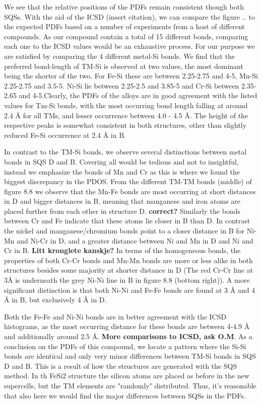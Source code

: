 We see that the relative positions of the PDFs remain consistent though both SQSs. With the aid of the ICSD (insert citation), we can compare the figure .. to the expected PDFs based on a number of experiments from a host of different compounds. As our compound contain a total of 15 different bonds, comparing each one to the ICSD values would be an exhaustive process. For our purpose we are satisfied by comparing the 4 different metal-Si bonds. We find that the preferred bond-length of TM-Si is observed at two values, the most dominant being the shorter of the two. For Fe-Si these are between 2.25-2.75 and 4-5, Mn-Si 2.25-2.75 and 3.5-5. Ni-Si lie between 2.25-2.5 and 3.85-5 and Cr-Si between 2.35-2.65 and 4-5.Clearly, the PDFs of the alloys are in good agreement with the listed values for Tm-Si bonds, with the most occurring bond length falling at around 2.4 Å for all TMs, and lesser occurrence between 4.0 - 4.5 Å. The height of the respective peaks is somewhat consistent in both structures, other than slightly reduced Fe-Si occurrence at 2.4 Å in B.

In contrast to the TM-Si bonds, we observe several distinctions between metal bonds in SQS D and B. Covering all would be tedious and not to insightful, instead we emphasize the bonds of Mn and Cr as this is where we found the biggest discrepancy in the PDOS. From the different TM-TM bonds (middle) of figure 8.8 we observe that the Mn-Fe bonds are most occurring at short distances in D and bigger distances in B, meaning that manganese and iron atoms are placed further from each other in structure D. \textbf{correct?} Similarly the bonds between Cr and Fe   indicate that these atoms lie closer in B than D. In contrast the nickel and manganese/chromium bonds point to a closer distance in B for Ni-Mn and Ni-Cr in D, and a greater distance between Ni and Mn in D and Ni and Cr in B. \textbf{Litt kronglete kanskje?} In terms of the homogeneous bonds, the properties of both Cr-Cr bonds and Mn-Mn bonds are more or less alike in both structures besides some majority at shorter distance in D (The red Cr-Cr line at 3Å is underneath the grey Ni-Ni line in B in figure 8.8 (bottom right)). A more significant distinction is that both Ni-Ni and Fe-Fe bonds are found at 3 Å and 4 Å in B, but exclusively 4 Å in D.    

Both the Fe-Fe and Ni-Ni bonds are in better agreement with the ICSD histograms, as the most occurring distance for these bonds are between 4-4.9 Å and additionally around 2.5 Å. \textbf{More comparisons to ICSD, ask O.M}. As a conclusion on the PDFs of this compound, we locate a pattern where the Si-Si bonds are identical and only very minor differences between TM-Si bonds in SQS D and B. This is a result of how the structures are generated with the SQS method. In th FeSi2 structure the silicon atoms are placed as before in the new supercells, but the TM elements are "randomly" distributed. Thus, it's reasonable that also here we would find the major differences between SQSs in the PDFs. 

